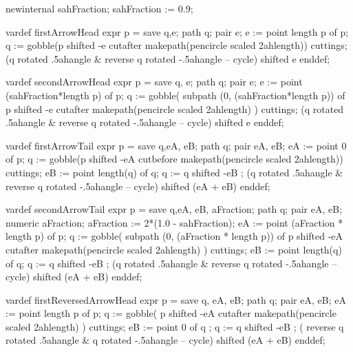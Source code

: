 
  newinternal sahFraction;
  sahFraction := 0.9; %
  
  
  vardef firstArrowHead expr p =
    save q,e; path q; pair e;
    e := point length p of p;
    q := gobble(p shifted -e cutafter makepath(pencircle scaled 2ahlength))
      cuttings;
    (q rotated .5ahangle & reverse q rotated -.5ahangle -- cycle)  shifted e
  enddef;
  
  vardef secondArrowHead expr p =
    save q, e; path q; pair e;
    e := point (sahFraction*length p) of p;
    q := gobble(
      subpath (0, (sahFraction*length p)) of p shifted -e 
      cutafter makepath(pencircle scaled 2ahlength)
    ) cuttings;
    (q rotated .5ahangle & reverse q rotated -.5ahangle -- cycle)  shifted e
  enddef;
  
  vardef firstArrowTail expr p =
    save q,eA, eB; path q; pair eA, eB;
    eA := point 0 of p;
    q := gobble(p shifted -eA cutbefore makepath(pencircle scaled 2ahlength))
      cuttings;
    eB := point length(q) of q;
    q := q shifted -eB ;
    (q rotated .5ahangle & reverse q rotated -.5ahangle -- cycle)
      shifted (eA + eB)
  enddef;
  
  vardef secondArrowTail expr p =
    save q,eA, eB, aFraction; path q; pair eA, eB; numeric aFraction;
    aFraction := 2*(1.0 - sahFraction);
    eA := point (aFraction * length p) of p;
    q := gobble(
      subpath (0, (aFraction * length p)) of p shifted -eA
      cutafter makepath(pencircle scaled 2ahlength)
    ) cuttings;
    eB := point length(q) of q;
    q := q shifted -eB ;
    (q rotated .5ahangle & reverse q rotated -.5ahangle -- cycle)
      shifted (eA + eB)
  enddef;

  
  vardef firstReversedArrowHead expr p =
    save q, eA, eB; path q; pair eA, eB;
    eA := point length p of p;
    q := gobble(
      p shifted -eA 
      cutafter makepath(pencircle scaled 2ahlength)
    ) cuttings;
    eB := point 0 of q ;
    q := q shifted -eB ;
    ( reverse q rotated .5ahangle & q rotated -.5ahangle -- cycle)
      shifted (eA + eB)
  enddef;

